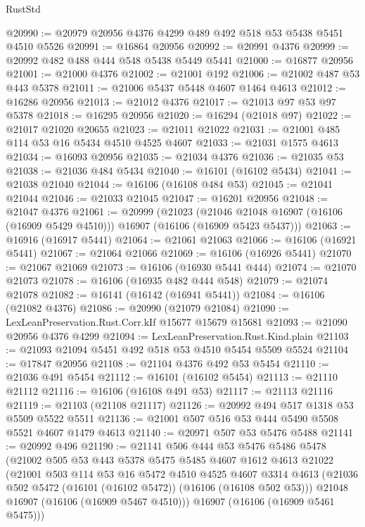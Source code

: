\begin{lexlean}{RustStd}
\begin{coremodule}
@20990 := @20979 @20956 @4376 @4299 @489 @492 @518 @53 @5438 @5451 @4510 @5526
@20991 := @16864 @20956
@20992 := @20991 @4376
@20999 := @20992 @482 @488 @444 @548 @5438 @5449 @5441
@21000 := @16877 @20956
@21001 := @21000 @4376
@21002 := @21001 @192
@21006 := @21002 @487 @53 @443 @5378
@21011 := @21006 @5437 @5448 @4607 @1464 @4613
@21012 := @16286 @20956
@21013 := @21012 @4376
@21017 := @21013 @97 @53 @97 @5378
@21018 := @16295 @20956
@21020 := @16294 (@21018 @97)
@21022 := @21017 @21020 @20655
@21023 := @21011 @21022
@21031 := @21001 @485 @114 @53 @16 @5434 @4510 @4525 @4607
@21033 := @21031 @1575 @4613
@21034 := @16093 @20956
@21035 := @21034 @4376
@21036 := @21035 @53
@21038 := @21036 @484 @5434
@21040 := @16101 (@16102 @5434)
@21041 := @21038 @21040
@21044 := @16106 (@16108 @484 @53)
@21045 := @21041 @21044
@21046 := @21033 @21045
@21047 := @16201 @20956
@21048 := @21047 @4376
@21061 := @20999
    (@21023
      (@21046 @21048 @16907 (@16106 (@16909 @5429 @4510)))
      @16907
      (@16106 (@16909 @5423 @5437)))
@21063 := @16916 (@16917 @5441)
@21064 := @21061 @21063
@21066 := @16106 (@16921 @5441)
@21067 := @21064 @21066
@21069 := @16106 (@16926 @5441)
@21070 := @21067 @21069
@21073 := @16106 (@16930 @5441 @444)
@21074 := @21070 @21073
@21078 := @16106 (@16935 @482 @444 @548)
@21079 := @21074 @21078
@21082 := @16141 (@16142 (@16941 @5441))
@21084 := @16106 (@21082 @4376)
@21086 := @20990 (@21079 @21084)
@21090 := LexLeanPreservation.Rust.Corr.kIf @15677 @15679 @15681
@21093 := @21090 @20956 @4376 @4299
@21094 := LexLeanPreservation.Rust.Kind.plain
@21103 := @21093 @21094 @5451 @492 @518 @53 @4510 @5454 @5509 @5524
@21104 := @17847 @20956
@21108 := @21104 @4376 @492 @53 @5454
@21110 := @21036 @491 @5454
@21112 := @16101 (@16102 @5454)
@21113 := @21110 @21112
@21116 := @16106 (@16108 @491 @53)
@21117 := @21113 @21116
@21119 := @21103 (@21108 @21117)
@21126 := @20992 @494 @517 @1318 @53 @5509 @5522 @5511
@21136 := @21001 @507 @516 @53 @444 @5490 @5508 @5521 @4607 @1479 @4613
@21140 := @20971 @507 @53 @5476 @5488
@21141 := @20992 @496
@21190 := @21141
    @506
    @444
    @53
    @5476
    @5486
    @5478
    (@21002
      @505
      @53
      @443
      @5378
      @5475
      @5485
      @4607
      @1612
      @4613
      @21022
      (@21001
        @503
        @114
        @53
        @16
        @5472
        @4510
        @4525
        @4607
        @3314
        @4613
        (@21036 @502 @5472 (@16101 (@16102 @5472)) (@16106 (@16108 @502 @53)))
        @21048
        @16907
        (@16106 (@16909 @5467 @4510)))
      @16907
      (@16106 (@16909 @5461 @5475)))

\end{coremodule}
\end{lexlean}
